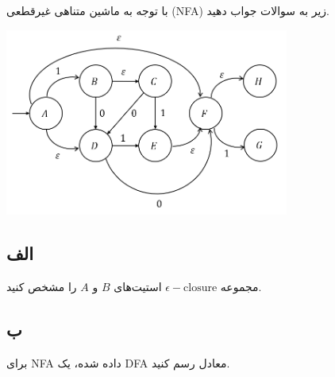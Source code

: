 با توجه به ماشین متناهی غیرقطعی
(NFA)
زیر به سوالات جواب دهید.

\begin{center}
    \includegraphics[width = 0.7\textwidth]{"commons/image1.png"}
\end{center}

\subsection*{الف}
مجموعه
$\epsilon - \text{closure}$
استیت‌های
$B$
و
$A$
را مشخص کنید.

\subsection*{ب}
برای
NFA
داده شده، یک
DFA
معادل رسم کنید.